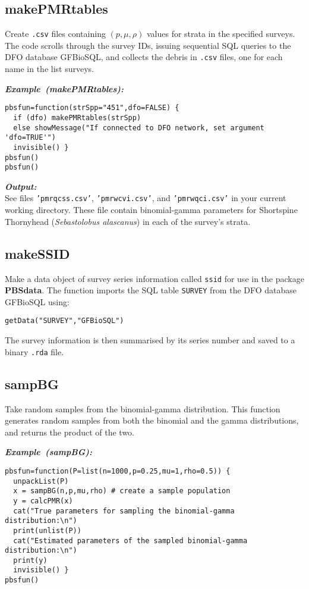 \documentclass[letterpaper,12pt,fleqn]{article}
\def\tab{\hspace{0.5 in}}
\newcommand{\code}[1]{\small\texttt{#1}\normalsize}
\newcommand{\pkg}[1]{{\bf #1}}
\newcommand{\db}[1]{\small\textmd{\textsf{#1}}\normalsize}
\newcommand\example[1]{    %
	\textbf{\emph{Example~(#1):}}\\ \vspace{3 pt}
}
\begin{document}
\subsection {makePMRtables}

\tab Create \code{.csv} files containing $(p, \mu, \rho)$ \citep{Schnute-Haigh:2003} values for strata in the specified surveys. The code scrolls through the survey IDs, issuing sequential SQL queries to the DFO database \db{GFBioSQL}, and collects the debris in \code{.csv} files, one for each name in the list surveys.

\begin{examplebox}
\example{makePMRtables}
\begin{Verbatim}[fontsize=\footnotesize]
pbsfun=function(strSpp="451",dfo=FALSE) {
  if (dfo) makePMRtables(strSpp)
  else showMessage("If connected to DFO network, set argument 'dfo=TRUE'")
  invisible() }
pbsfun()
pbsfun()
\end{Verbatim}
\end{examplebox}

\textbf{\emph{Output:}}\\
See files \code{'pmr\-qcss.csv'}, \code{'pmr\-wcvi.csv'}, and \code{'pmr\-wqci.csv'} in your current working directory. These file contain binomial-gamma parameters for Shortspine Thornyhead (\emph{Sebastolobus alascanus}) in each of the survey's strata.

\subsection {makeSSID}

\tab Make a data object of survey series information called \code{ssid} for use in the package \pkg{PBSdata}.
The function imports the SQL table \code{SURVEY} from the DFO database \db{GFBioSQL} using:

\code{getData("SURVEY","GFBioSQL")}

The survey information is then summarised by its series number and saved to a binary \code{.rda} file. 

\subsection {sampBG}

\tab Take random samples from the binomial-gamma distribution. This function generates random samples from both the binomial and the gamma distributions, and returns the product of the two.

\begin{examplebox}
\example{sampBG}
\begin{Verbatim}[fontsize=\footnotesize]
pbsfun=function(P=list(n=1000,p=0.25,mu=1,rho=0.5)) {
  unpackList(P)
  x = sampBG(n,p,mu,rho) # create a sample population
  y = calcPMR(x)
  cat("True parameters for sampling the binomial-gamma distribution:\n")
  print(unlist(P))
  cat("Estimated parameters of the sampled binomial-gamma distribution:\n")
  print(y)
  invisible() }
pbsfun()
\end{Verbatim}
\end{examplebox}
\end{document}
